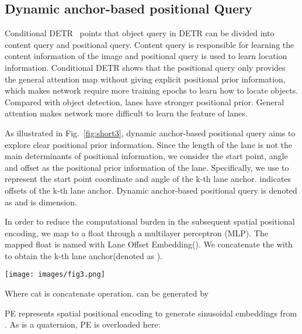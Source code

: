 \documentclass{bmvc2k}
\begin{document}
\subsection{Dynamic anchor-based positional Query}
\label{sec:dynamic}
Conditional DETR~\cite{meng2021conditional} points that object query in DETR can be divided into content 
query and positional query. Content query is responsible for learning the content 
information of the image and positional query is used to learn location information. 
Conditional DETR shows that the positional query only provides the general attention 
map without giving explicit positional prior information, which makes 
network require more training epochs to learn how to locate objects. Compared with object detection, 
lanes have stronger positional prior. General attention makes network more difficult to learn the feature of lanes. 

As illustrated in Fig.~\ref{fig:short3}, dynamic anchor-based positional query aims to explore clear positional prior information. 
Since the length of the lane is not the main determinants of positional information, 
we consider the start point, angle and offset as the positional prior information of the lane.
Specifically, we use  to represent the start point coordinate and angle of the k-th lane anchor.  indicates  offsets of the k-th lane anchor.
Dynamic anchor-based positional query is denoted as  and  is dimension. 

In order to reduce the computational burden in the subsequent spatial positional encoding,
we map  to a float through a multilayer perceptron (MLP).
The mapped float is named with Lane Offset Embedding(). We concatenate the  with  to 
obtain the k-th lane anchor(denoted as ).
\begin{figure*}[!h]
   \begin{center}
   \texttt{[image: images/fig3.png]}
   \vspace{-0.5cm} 
   \end{center}
      \caption{Structure of Decoder Layer. Q, K and V represent Query, Key and Value.}
      \vspace{-0.5cm}
   \label{fig:short3}
   \end{figure*} 

\vspace{-0.35cm}


Where cat is concatenate operation.  can be generated by

PE represents spatial positional encoding to generate sinusoidal embeddings from . As  is a quaternion, PE is overloaded here: 
\end{document}
